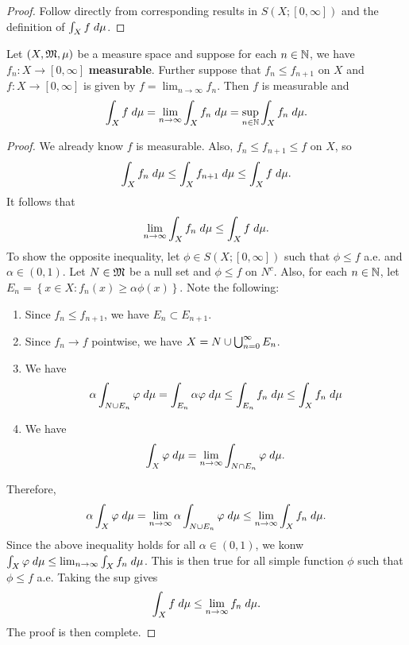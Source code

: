 \documentclass[a4paper]{article}
\begin{document}
\begin{proof}
Follow directly from corresponding results in $S(X; [0, \infty])$
and the definition of $\int_X f \; d \mu$.
\end{proof}

\begin{thm}
Let $(X, \mathfrak{M}, \mu)$ be a measure space and suppose for 
each $n \in \mathbb{N}$, we have $f_n : 
X \to [0, \infty]$ \textbf{measurable}. Further suppose 
that $f_n \leq f_{n+1}$ on $X$ and $f: X \to [0, \infty]$
is given by $f = \lim_{n \to \infty} f_n$. Then 
$f$ is measurable and 
\[
\int_X f \; d \mu = \lim_{n \to \infty} \int_X f_n \; d \mu
= \sup_{n \in \mathbb{N}} \int_X f_n \; d \mu.
\]
\end{thm}

\begin{proof}
We already know $f$ is measurable. Also, $f_n \leq f_{n+1}
\leq f$ on $X$, so 
\[
\int_X f_n \; d \mu \leq \int_X f_{n+1} \; d \mu \leq 
\int_X f \; d \mu.
\]
It follows that 
\[
\lim_{n \to \infty} \int_X f_n \; d \mu \leq \int_X f \; d \mu.
\]
To show the opposite inequality, let 
$\phi \in S(X; [0, \infty])$ such that $\phi \leq f$ a.e.
and $\alpha \in (0, 1)$. Let $N \in \mathfrak{M}$ be a null set 
and $\phi \leq f$ on $N^c$. Also, for each $n \in \mathbb{N}$, let 
$E_n = \left\{ x \in X : f_n(x) \geq \alpha \phi(x) \right\}$.
Note the following:
\begin{enumerate}
  \item Since $f_n \leq f_{n+1}$, we have $E_n \subset E_{n+1}$.
  \item Since $f_n \to f$ pointwise, we have $X = N \cup \bigcup_{n=0}^\infty
  E_n$.
  \item We have 
  \[
  \alpha \int_{N \cup E_n} \varphi \; d \mu 
  = \int_{E_n} \alpha \varphi \; d \mu 
  \leq \int_{E_n} f_n \; d \mu
  \leq \int_X f_n \; d \mu
  \]
  \item We have 
  \[
  \int_X \varphi \; d \mu
  = \lim_{n \to \infty} \int_{N \cap E_n} \varphi \; d \mu.
  \]
\end{enumerate}
Therefore, 
\[
\alpha \int_X \varphi \; d \mu 
= \lim_{n \to \infty} \alpha \int_{N \cup E_n} \varphi \; d \mu
\leq \lim_{n \to \infty} \int_X f_n \; d \mu.
\]
Since the above inequality holds for all $\alpha \in (0, 1)$,
we konw $\int_X \varphi \; d \mu \leq \lim_{n \to \infty} 
\int_X f_n \; d \mu$. This is then true for all simple function 
$\phi$ such that $\phi \leq f$ a.e. Taking the sup 
gives 
\[
\int_X f \; d \mu \leq \lim_{n \to \infty} f_n \; d \mu.
\]
The proof is then complete.
\end{proof}
\end{document}
